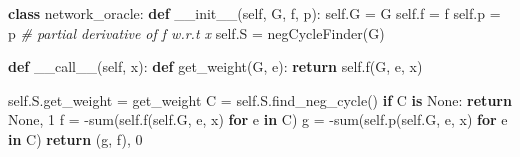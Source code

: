 \documentclass[10pt,ignorenonframetext,serif,onlymath]{beamer}
\newenvironment{Shaded}{}{}
\newcommand{\BuiltInTok}[1]{#1}
\newcommand{\CommentTok}[1]{\textcolor[rgb]{0.38,0.63,0.69}{\textit{#1}}}
\newcommand{\ControlFlowTok}[1]{\textcolor[rgb]{0.00,0.44,0.13}{\textbf{#1}}}
\newcommand{\DecValTok}[1]{\textcolor[rgb]{0.25,0.63,0.44}{#1}}
\newcommand{\FunctionTok}[1]{\textcolor[rgb]{0.02,0.16,0.49}{#1}}
\newcommand{\KeywordTok}[1]{\textcolor[rgb]{0.00,0.44,0.13}{\textbf{#1}}}
\newcommand{\NormalTok}[1]{#1}
\newcommand{\OperatorTok}[1]{\textcolor[rgb]{0.40,0.40,0.40}{#1}}
\newcommand{\VariableTok}[1]{\textcolor[rgb]{0.10,0.09,0.49}{#1}}
\begin{document}
\begin{frame}[fragile]

\begin{Shaded}
\begin{Highlighting}[]
\KeywordTok{class}\NormalTok{ network_oracle:}
    \KeywordTok{def} \FunctionTok{__init__}\NormalTok{(}\VariableTok{self}\NormalTok{, G, f, p):}
        \VariableTok{self}\NormalTok{.G }\OperatorTok{=}\NormalTok{ G}
        \VariableTok{self}\NormalTok{.f }\OperatorTok{=}\NormalTok{ f}
        \VariableTok{self}\NormalTok{.p }\OperatorTok{=}\NormalTok{ p  }\CommentTok{# partial derivative of f w.r.t x}
        \VariableTok{self}\NormalTok{.S }\OperatorTok{=}\NormalTok{ negCycleFinder(G)}

    \KeywordTok{def} \FunctionTok{__call__}\NormalTok{(}\VariableTok{self}\NormalTok{, x):}
        \KeywordTok{def}\NormalTok{ get_weight(G, e):}
            \ControlFlowTok{return} \VariableTok{self}\NormalTok{.f(G, e, x)}

        \VariableTok{self}\NormalTok{.S.get_weight }\OperatorTok{=}\NormalTok{ get_weight}
\NormalTok{        C }\OperatorTok{=} \VariableTok{self}\NormalTok{.S.find_neg_cycle()}
        \ControlFlowTok{if}\NormalTok{ C }\KeywordTok{is} \VariableTok{None}\NormalTok{:}
            \ControlFlowTok{return} \VariableTok{None}\NormalTok{, }\DecValTok{1}
\NormalTok{        f }\OperatorTok{=} \OperatorTok{-}\BuiltInTok{sum}\NormalTok{(}\VariableTok{self}\NormalTok{.f(}\VariableTok{self}\NormalTok{.G, e, x) }\ControlFlowTok{for}\NormalTok{ e }\KeywordTok{in}\NormalTok{ C)}
\NormalTok{        g }\OperatorTok{=} \OperatorTok{-}\BuiltInTok{sum}\NormalTok{(}\VariableTok{self}\NormalTok{.p(}\VariableTok{self}\NormalTok{.G, e, x) }\ControlFlowTok{for}\NormalTok{ e }\KeywordTok{in}\NormalTok{ C)}
        \ControlFlowTok{return}\NormalTok{ (g, f), }\DecValTok{0}
\end{Highlighting}
\end{Shaded}

\end{frame}
\end{document}
